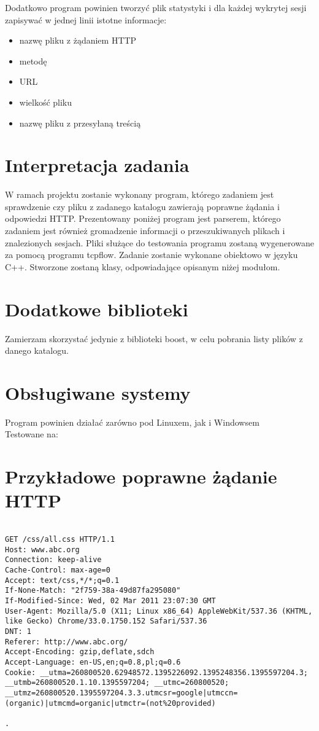 \documentclass[a4paper,11pt]{report}
\begin{document}
Dodatkowo program powinien tworzyć plik statystyki i dla każdej wykrytej
sesji zapisywać w jednej linii istotne informacje: 

\begin{itemize}
\item
	nazwę pliku z żądaniem HTTP
\item
	metodę
\item
    URL
\item
    wielkość pliku
\item
    nazwę pliku z przesyłaną treścią
\end{itemize}
	
\section{Interpretacja zadania}

W ramach projektu zostanie wykonany program, którego zadaniem jest sprawdzenie czy pliku z zadanego katalogu zawierają poprawne żądania i odpowiedzi HTTP. Prezentowany poniżej program jest parserem, którego zadaniem jest również gromadzenie informacji o przeszukiwanych plikach i znalezionych sesjach. Pliki służące do testowania programu zostaną wygenerowane za pomocą programu tcpflow. Zadanie zostanie wykonane obiektowo w języku C++. Stworzone zostaną klasy, odpowiadające opisanym niżej modułom.

\section{Dodatkowe biblioteki}

Zamierzam skorzystać jedynie z biblioteki boost, w celu pobrania listy plików z danego katalogu.

\section{Obsługiwane systemy}

Program powinien działać zarówno pod Linuxem, jak i Windowsem
\\ Testowane na:

\section{Przykładowe poprawne żądanie HTTP}

\begin{lstlisting}

GET /css/all.css HTTP/1.1
Host: www.abc.org
Connection: keep-alive
Cache-Control: max-age=0
Accept: text/css,*/*;q=0.1
If-None-Match: "2f759-38a-49d87fa295080"
If-Modified-Since: Wed, 02 Mar 2011 23:07:30 GMT
User-Agent: Mozilla/5.0 (X11; Linux x86_64) AppleWebKit/537.36 (KHTML, like Gecko) Chrome/33.0.1750.152 Safari/537.36
DNT: 1
Referer: http://www.abc.org/
Accept-Encoding: gzip,deflate,sdch
Accept-Language: en-US,en;q=0.8,pl;q=0.6
Cookie: __utma=260800520.62948572.1395226092.1395248356.1395597204.3; __utmb=260800520.1.10.1395597204; __utmc=260800520; __utmz=260800520.1395597204.3.3.utmcsr=google|utmccn=(organic)|utmcmd=organic|utmctr=(not%20provided)

.
\end{lstlisting}
\end{document}
